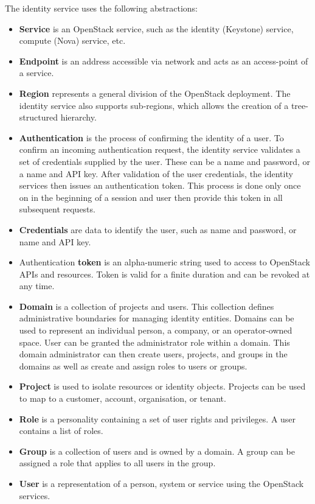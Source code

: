 The identity service uses the following abstractions:
\begin{itemize}
  \item{\textbf{Service} is an OpenStack service, such as the identity (Keystone) service, compute (Nova) service, etc.}
  \item{\textbf{Endpoint} is an address accessible via network and acts as an access-point of a service.}
  \item{\textbf{Region} represents a general division of the OpenStack deployment. The identity service also supports sub-regions, which allows the creation of a tree-structured hierarchy.}
  \item{\textbf{Authentication} is the process of confirming the identity of a user. To confirm an incoming authentication request, the identity service validates a set of credentials supplied by the user. These can be a name and password, or a name and API key. After validation of the user credentials, the identity services then issues an authentication token. This process is done only once on in the beginning of a session and user then provide this token in all subsequent requests.}
  \item{\textbf{Credentials} are data to identify the user, such as name and password, or name and API key.}
  \item{Authentication \textbf{token} is an alpha-numeric string used to access to OpenStack APIs and resources. Token is valid for a finite duration and can be revoked at any time.}
  \item{\textbf{Domain} is a collection of projects and users. This collection defines administrative boundaries for managing identity entities. Domains can be used to represent an individual person, a company, or an operator-owned space. User can be granted the administrator role within a domain. This domain administrator can then create users, projects, and groups in the domains as well as create and assign roles to users or groups.}
  \item{\textbf{Project} is used to isolate resources or identity objects. Projects can be used to map to a customer, account, organisation, or tenant.}
  \item{\textbf{Role} is a personality containing a set of user rights and privileges. A user contains a list of roles.}
  \item{\textbf{Group} is a collection of users and is owned by a domain. A group can be assigned a role that applies to all users in the group.}
  \item{\textbf{User} is a representation of a person, system or service using the OpenStack services.}
  \\\cite{CL210}
\end{itemize}


